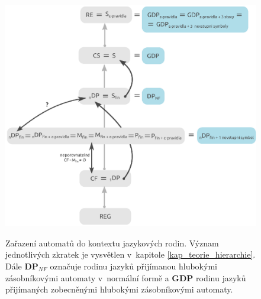 \begin{figure}[ht]
\centering
\includegraphics{img/bp_hierarchy03.eps} \bigskip \\
\caption{Zařazení automatů do kontextu jazykových rodin. Význam jednotlivých zkratek je vysvětlen v~kapitole \ref{kap_teorie_hierarchie}. Dále \textbf{DP${}_{NF}$} označuje rodinu jazyků přijímanou hlubokými zásobníkovými automaty v~normální formě a \textbf{GDP} rodinu jazyků přijímaných zobecněnými hlubokými zásobníkovými automaty.}
\label{obr_model02_hierarchy}
\end{figure}


